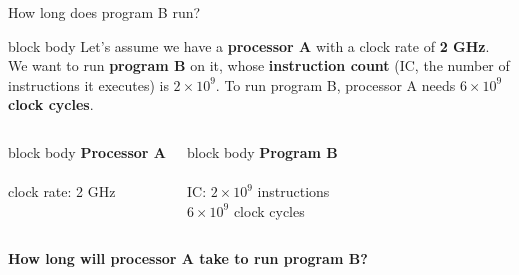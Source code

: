 \documentclass[aspectratio=169,10pt]{beamer}
\begin{document}
\begin{frame}{How long does program B run?}
  \begin{beamercolorbox}[rounded=true,sep=0.14cm,wd=\textwidth]{block body}
    \small Let's assume we have a \textbf{processor A} with a clock rate of \textbf{2 GHz}.
    We want to run \textbf{program B} on it, whose \textbf{instruction count} (IC, the number of instructions it executes)
    is $2 \times 10^9$. To run program B, processor A needs $6 \times 10^9$ \textbf{clock cycles}.
  \end{beamercolorbox}
  \vspace{0.4cm}
  \begin{columns}[T,onlytextwidth]
      \begin{beamercolorbox}[rounded=true,sep=0.16cm,wd=\linewidth]{block body}
        \centering\large\textbf{Processor A}\\[0.1cm]
        {\Huge\textcolor{DeepBlue}{\faMicrochip}}\\[0.1cm]
        \normalsize clock rate: 2 GHz
      \end{beamercolorbox}
      \begin{beamercolorbox}[rounded=true,sep=0.16cm,wd=\linewidth]{block body}
        \centering\large\textbf{Program B}\\[0.1cm]
        {\Huge\textcolor{DeepBlue}{\faFileCode}}\\[0.1cm]
        \normalsize IC: $2 \times 10^9$ instructions\\ $6 \times 10^9$ clock cycles
      \end{beamercolorbox}
  \end{columns}
  \vspace{0.4cm}
  \begin{center}
    \Large\textbf{How long will processor A take to run program B?}
  \end{center}
\end{frame}
\end{document}
